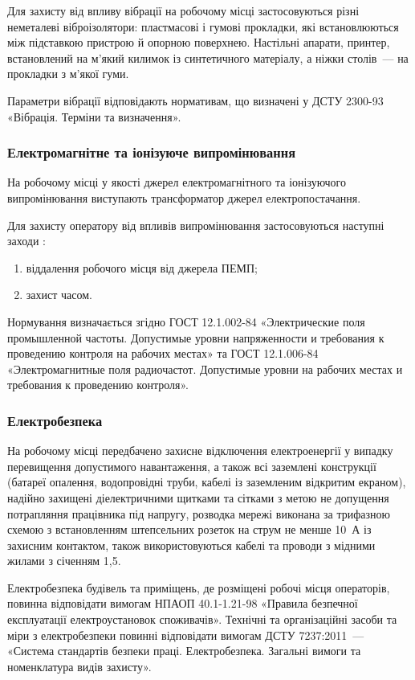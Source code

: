 \documentclass[a4paper,ukrainian,utf8,nocolumnsxix,nocolumnxxxii,nocolumnxxxi,floatsection,equationsection]{eskdtext}
\renewcommand\paragraph{\subsubsection}
\begin{document}
Для захисту від впливу вібрації  на робочому місці застосовуються різні неметалеві віброізолятори: пластмасові і гумові прокладки, які встановлюються між підставкою пристрою й опорною поверхнею. Настільні апарати, принтер, встановлений на м'який килимок із синтетичного матеріалу, а ніжки столів~--- на прокладки з м'якої гуми.

Параметри вібрації відповідають нормативам, що визначені у ДСТУ 2300-93 «Вібрація. Терміни та визначення».

\paragraph{Електромагнітне та іонізуюче випромінювання}

На робочому місці у якості джерел електромагнітного та іонізуючого випромінювання виступають трансформатор джерел електропостачання.


Для захисту оператору від впливів випромінювання застосовуються наступні заходи \cite{work:safety:17}:

\begin{enumerate}
	\item віддалення робочого місця від джерела ПЕМП;
	\item захист часом.
\end{enumerate}

Нормування визначається згідно ГОСТ 12.1.002-84 «Электрические поля промышленной частоты. Допустимые уровни напряженности и требования к проведению контроля на рабочих местах» та ГОСТ 12.1.006-84 «Электромагнитные поля радиочастот. Допустимые уровни на рабочих местах и требования к проведению контроля».

\paragraph{Електробезпека}

На робочому місці передбачено захисне відключення електроенергії у випадку перевищення допустимого навантаження, а також всі заземлені конструкції (батареї опалення,  водопровідні труби, кабелі із заземленим відкритим екраном), надійно захищені діелектричними щитками та сітками з метою не допущення потрапляння працівника під напругу, розводка мережі виконана за трифазною схемою з встановленням штепсельних розеток на струм не менше 10~А із захисним контактом, також використовуються кабелі та проводи з мідними жилами з січенням 1,5.

Електробезпека будівель та приміщень, де розміщені робочі місця операторів, повинна відповідати вимогам НПАОП 40.1-1.21-98 «Правила безпечної експлуатації електроустановок споживачів». Технічні та організаційні засоби та міри з електробезпеки повинні відповідати вимогам ДСТУ 7237:2011~--- «Система стандартів безпеки праці. Електробезпека. Загальні вимоги та номенклатура видів захисту».
\end{document}
